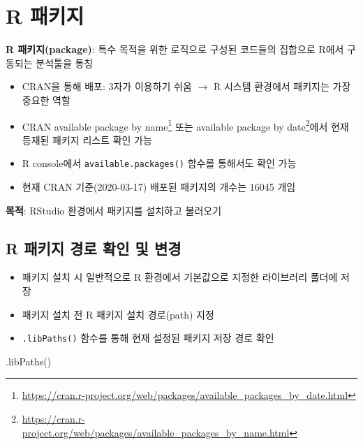 \documentclass[
  11pt,
]{krantz}
\makeatletter
\newenvironment{Shaded}{\begin{snugshade}}{\end{snugshade}}
\newcommand{\FunctionTok}[1]{\textcolor[rgb]{0,0,0}{#1}}
\newcommand{\NormalTok}[1]{#1}
\providecommand{\tightlist}{%
  \setlength{\itemsep}{0pt}\setlength{\parskip}{0pt}}
\renewcommand{\href}[2]{#2\footnote{\url{#1}}}
\newenvironment{kframe}{%
\medskip{}
\setlength{\fboxsep}{.8em}
 \def\at@end@of@kframe{}%
 \ifinner\ifhmode%
  \def\at@end@of@kframe{\end{minipage}}%
  \begin{minipage}{\columnwidth}%
 \fi\fi%
 \def\FrameCommand##1{\hskip\@totalleftmargin \hskip-\fboxsep
 \colorbox{shadecolor}{##1}\hskip-\fboxsep
     \hskip-\linewidth \hskip-\@totalleftmargin \hskip\columnwidth}%
 \MakeFramed {\advance\hsize-\width
   \@totalleftmargin\z@ \linewidth\hsize
   \@setminipage}}%
 {\par\unskip\endMakeFramed%
 \at@end@of@kframe}
\newenvironment{rmdblock}[1]
  {
  \begin{itemize}
  \renewcommand{\labelitemi}{
    \raisebox{-.7\height}[0pt][0pt]{
      {\setkeys{Gin}{width=3em,keepaspectratio}\texttt{[image: images/\#1]}}
    }
  }
  \setlength{\fboxsep}{1em}
  \begin{kframe}
  \item
  }
  {
  \end{kframe}
  \end{itemize}
  }
\newenvironment{rmdnote}
  {\begin{rmdblock}{note}}
  {\end{rmdblock}}
\makeatother
\begin{document}
\normalsize

\hypertarget{r-package}{%
\section{R 패키지}\label{r-package}}

\footnotesize

\begin{rmdnote}
\textbf{R 패키지(package)}: 특수 목적을 위한 로직으로 구성된 코드들의 집합으로 R에서 구동되는 분석툴을 통칭

\begin{itemize}
\tightlist
\item
  CRAN을 통해 배포: 3자가 이용하기 쉬움 \(\rightarrow\) R 시스템 환경에서 패키지는 가장 중요한 역할
\item
  CRAN \href{https://cran.r-project.org/web/packages/available_packages_by_date.html}{available package by name} 또는 \href{https://cran.r-project.org/web/packages/available_packages_by_name.html}{available package by date}에서 현재 등재된 패키지 리스트 확인 가능
\item
  R console에서 \texttt{available.packages()} 함수를 통해서도 확인 가능
\item
  현재 CRAN 기준(2020-03-17) 배포된 패키지의 개수는 16045 개임
\end{itemize}

\textbf{목적}: RStudio 환경에서 패키지를 설치하고 불러오기
\end{rmdnote}

\normalsize

\hypertarget{r-package-path}{%
\subsection{R 패키지 경로 확인 및 변경}\label{r-package-path}}

\begin{itemize}
\tightlist
\item
  패키지 설치 시 일반적으로 R 환경에서 기본값으로 지정한 라이브러리 폴더에 저장
\item
  패키지 설치 전 R 패키지 설치 경로(path) 지정
\item
  \texttt{.libPaths()} 함수를 통해 현재 설정된 패키지 저장 경로 확인
\end{itemize}

\footnotesize

\begin{Shaded}
\begin{Highlighting}[]
\FunctionTok{.libPaths}\NormalTok{()}
\end{Highlighting}
\end{Shaded}
\end{document}
